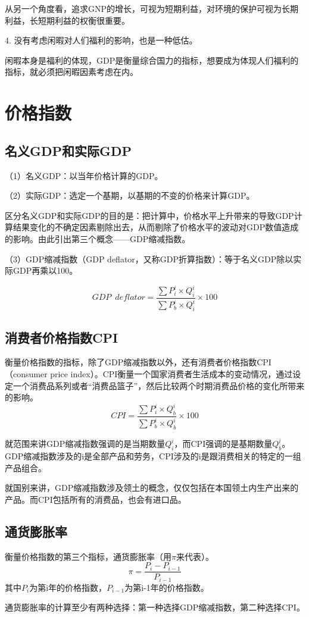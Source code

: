 \documentclass{article}
\begin{document}
从另一个角度看，追求GNP的增长，可视为短期利益，对环境的保护可视为长期利益，长短期利益的权衡很重要。

\hspace*{\fill}

4. 没有考虑闲暇对人们福利的影响，也是一种低估。

闲暇本身是福利的体现，GDP是衡量综合国力的指标，想要成为体现人们福利的指标，就必须把闲暇因素考虑在内。

\section{价格指数}
\subsection{名义GDP和实际GDP}
（1）名义GDP：以当年价格计算的GDP。

\hspace*{\fill}

（2）实际GDP：选定一个基期，以基期的不变的价格来计算GDP。

\hspace*{\fill}

区分名义GDP和实际GDP的目的是：把计算中，价格水平上升带来的导致GDP计算结果变化的不确定因素剔除出去，从而剔除了价格水平的波动对GDP数值造成的影响。由此引出第三个概念——GDP缩减指数。

\hspace*{\fill}

（3）GDP缩减指数（GDP deflator，又称GDP折算指数）：等于名义GDP除以实际GDP再乘以100。

\[
GDP\enspace deflator=\frac{\sum P^i_i\times Q^i_i}{\sum P^i_b\times Q^i_i}\times 100
\]

\subsection{消费者价格指数CPI}

衡量价格指数的指标，除了GDP缩减指数以外，还有消费者价格指数CPI（consumer price index）。CPI衡量一个国家消费者生活成本的变动情况，通过设定一个消费品系列或者“消费品篮子”，然后比较两个时期消费品价格的变化所带来的影响。
\[
CPI=\frac{\sum P^i_i\times Q^i_b}{\sum P^i_b\times Q^i_b}\times 100
\]

就范围来讲GDP缩减指数强调的是当期数量$ Q^i_i $，而CPI强调的是基期数量$ Q^i_b $。GDP缩减指数涉及的i是全部产品和劳务，CPI涉及的i是跟消费相关的特定的一组产品组合。

就国别来讲，GDP缩减指数涉及领土的概念，仅仅包括在本国领土内生产出来的产品。而CPI包括所有的消费品，也会有进口品。

\subsection{通货膨胀率}

衡量价格指数的第三个指标，通货膨胀率（用$ \pi $来代表）。
\[
\pi=\frac{P_i-P_{i-1}}{P_{i-1}}
\]
其中$ P_i $为第i年的价格指数，$ P_{i-1} $为第i-1年的价格指数。

通货膨胀率的计算至少有两种选择：第一种选择GDP缩减指数，第二种选择CPI。
\end{document}
